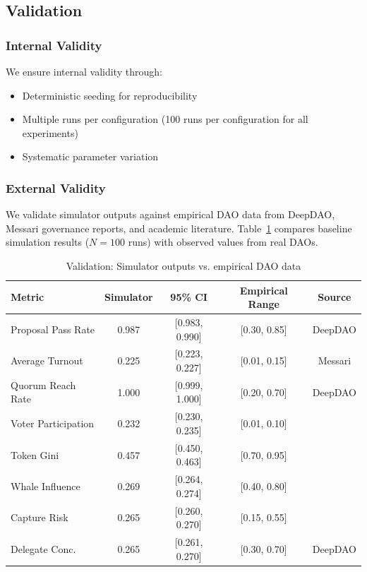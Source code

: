 \subsection{Validation}

\subsubsection{Internal Validity}

We ensure internal validity through:
\begin{itemize}
    \item Deterministic seeding for reproducibility
    \item Multiple runs per configuration (100 runs per configuration for all experiments)
    \item Systematic parameter variation
\end{itemize}

\subsubsection{External Validity}

We validate simulator outputs against empirical DAO data from DeepDAO, Messari governance reports, and academic literature. Table~\ref{tab:validation} compares baseline simulation results ($N=100$ runs) with observed values from real DAOs.

\begin{table}[htbp]
\centering
\caption{Validation: Simulator outputs vs. empirical DAO data}
\label{tab:validation}
\small
\begin{tabular}{@{}lcccc@{}}
\toprule
Metric & Simulator & 95\% CI & Empirical Range & Source \\
\midrule
Proposal Pass Rate & 0.987 & [0.983, 0.990] & [0.30, 0.85] & DeepDAO \\
Average Turnout & 0.225 & [0.223, 0.227] & [0.01, 0.15] & Messari \\
Quorum Reach Rate & 1.000 & [0.999, 1.000] & [0.20, 0.70] & DeepDAO \\
Voter Participation & 0.232 & [0.230, 0.235] & [0.01, 0.10] & \cite{barbereau2022dao} \\
Token Gini & 0.457 & [0.450, 0.463] & [0.70, 0.95] & \cite{nadler2020} \\
Whale Influence & 0.269 & [0.264, 0.274] & [0.40, 0.80] & \cite{fritsch2022} \\
Capture Risk & 0.265 & [0.260, 0.270] & [0.15, 0.55] & \cite{barbereau2022dao} \\
Delegate Conc. & 0.265 & [0.261, 0.270] & [0.30, 0.70] & DeepDAO \\
\bottomrule
\end{tabular}
\end{table}

